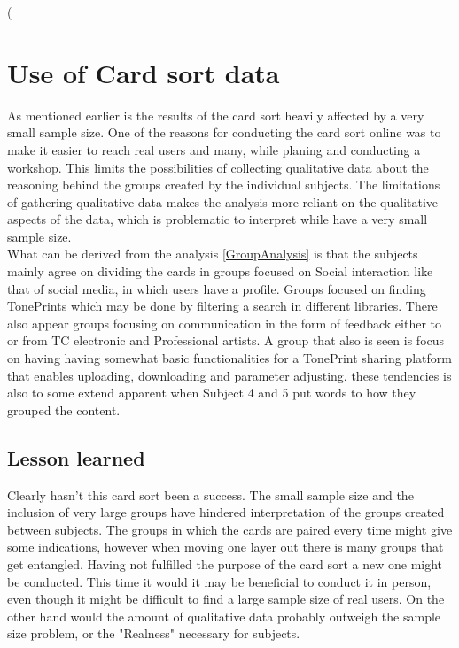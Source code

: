 (%




\section{Use of Card sort data}
\label{UseOfCardSortData}
%
As mentioned earlier is the results of the card sort heavily affected by a very small sample size. One of the reasons for conducting the card sort online was to make it easier to reach real users and many, while planing and conducting a workshop. This limits the possibilities of collecting qualitative data about the reasoning behind the groups created by the individual subjects. The limitations of gathering qualitative data makes the analysis more reliant on the qualitative aspects of the data, which is problematic to interpret while have a very small sample size. \\
What can be derived from the analysis \autoref{GroupAnalysis} is that the subjects mainly agree on dividing the cards in groups focused on Social interaction like that of social media, in which users have a profile. Groups focused on finding TonePrints which may be done by filtering a search in different libraries. There also appear groups focusing on communication in the form of feedback either to or from TC electronic and Professional artists. A group that also is seen is focus on having having somewhat basic functionalities for a TonePrint sharing platform that enables uploading, downloading and parameter adjusting. these tendencies is also to some extend apparent when Subject 4 and 5 put words to how they grouped the content.\\

\subsection{Lesson learned}
\label{LessonLearned}
Clearly hasn't this card sort been a success. The small sample size and the inclusion of very large groups have hindered interpretation of the groups created between subjects. The groups in which the cards are paired every time might give some indications, however when moving one layer out there is many groups that get entangled. Having not fulfilled the purpose of the card sort a new one might be conducted. This time it would it may be beneficial to conduct it in person, even though it might be difficult to find a large sample size of real users. On the other hand would the amount of qualitative data probably outweigh the sample size problem, or the "Realness" necessary for subjects. 







